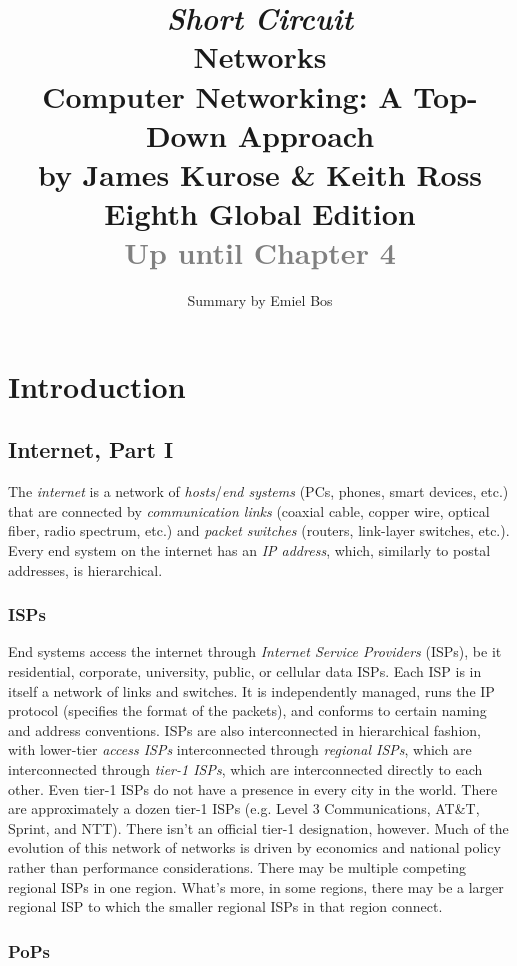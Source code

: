 \documentclass[table, xcdraw]{article}%
\title{
\textit{Short Circuit}\\
\vspace{15px}
\huge
Networks\\
\vspace{20px}
\large
Computer Networking: A Top-Down Approach\\
by James Kurose \& Keith Ross\\
Eighth Global Edition\\
\textcolor{gray}{Up until Chapter 4}
}
\author{Summary by Emiel Bos}
\date{}
\begin{document}
\maketitle

\section{Introduction} \label{ch:intro}

\subsection{Internet, Part I}

The \emph{internet} is a network of \emph{hosts}/\emph{end systems} (PCs, phones, smart devices, etc.) that are connected by \emph{communication links} (coaxial cable, copper wire, optical fiber, radio spectrum, etc.) and \emph{packet switches} (routers, link-layer switches, etc.). Every end system on the internet has an \emph{IP address}, which, similarly to postal addresses, is hierarchical.

\subsubsection{ISPs} \label{ISPs}

End systems access the internet through \emph{Internet Service Providers} (ISPs), be it residential, corporate, university, public, or cellular data ISPs. Each ISP is in itself a network of links and switches. It is independently managed, runs the IP protocol (specifies the format of the packets), and conforms to certain naming and address conventions. ISPs are also interconnected in hierarchical fashion, with lower-tier \emph{access ISPs} interconnected through \emph{regional ISPs}, which are interconnected through \emph{tier-1 ISPs}, which are interconnected directly to each other. Even tier-1 ISPs do not have a presence in every city in the world. There are approximately a dozen tier-1 ISPs (e.g. Level 3 Communications, AT\&T, Sprint, and NTT). There isn't an official tier-1 designation, however. Much of the evolution of this network of networks is driven by economics and national policy rather than performance considerations. There may be multiple competing regional ISPs in one region. What's more, in some regions, there may be a larger regional ISP to which the smaller regional ISPs in that region connect.

\subsubsection{PoPs}
\end{document}
